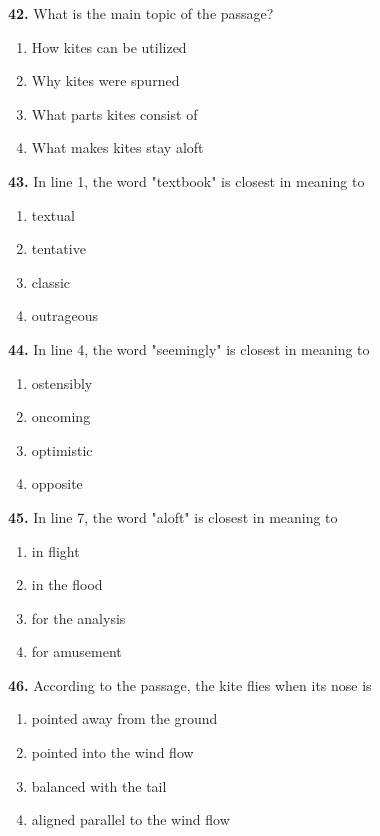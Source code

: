 \documentclass[12pt]{article}
\begin{document}
\endgroup
\medskip
\noindent\textbf{42.} What is the main topic of the passage?
\begin{enumerate}[label=(\Alph*),leftmargin=*,itemsep=0.2em]
\item How kites can be utilized
\item Why kites were spurned
\item What parts kites consist of
\item What makes kites stay aloft
\end{enumerate}
\par
\vspace{0.25\baselineskip}
\noindent\textbf{43.} In line 1, the word "textbook" is closest in meaning to
\begin{enumerate}[label=(\Alph*),leftmargin=*,itemsep=0.2em]
\item textual
\item tentative
\item classic
\item outrageous
\end{enumerate}
\par
\vspace{0.25\baselineskip}
\noindent\textbf{44.} In line 4, the word "seemingly" is closest in meaning to
\begin{enumerate}[label=(\Alph*),leftmargin=*,itemsep=0.2em]
\item ostensibly
\item oncoming
\item optimistic
\item opposite
\end{enumerate}
\par
\vspace{0.25\baselineskip}
\noindent\textbf{45.} In line 7, the word "aloft" is closest in meaning to
\begin{enumerate}[label=(\Alph*),leftmargin=*,itemsep=0.2em]
\item in flight
\item in the flood
\item for the analysis
\item for amusement
\end{enumerate}
\par
\vspace{0.25\baselineskip}
\noindent\textbf{46.} According to the passage, the kite flies when its nose is
\begin{enumerate}[label=(\Alph*),leftmargin=*,itemsep=0.2em]
\item pointed away from the ground
\item pointed into the wind flow
\item balanced with the tail
\item aligned parallel to the wind flow
\end{enumerate}
\end{document}

